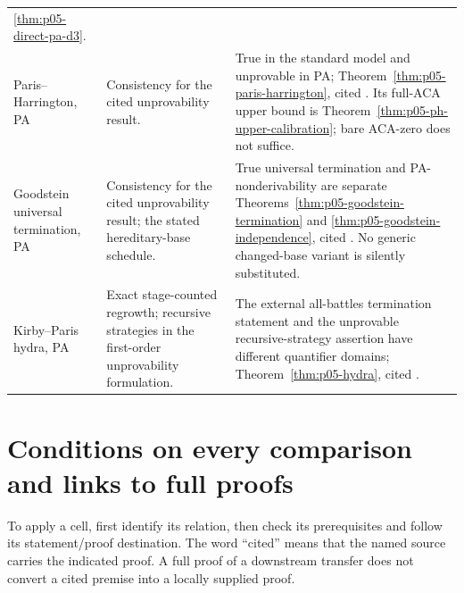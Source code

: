\begin{longtable}{@{}p{}p{}p{}@{}}
\ref{thm:p05-direct-pa-d3}. \\
\addlinespace
Paris--Harrington, PA & Consistency for the cited unprovability result. &
True in the standard model and unprovable in PA;
Theorem~\ref{thm:p05-paris-harrington}, cited
\cite{ParisHarrington1977}. Its full-ACA upper bound is
Theorem~\ref{thm:p05-ph-upper-calibration}; bare ACA-zero does not suffice. \\
\addlinespace
Goodstein universal termination, PA & Consistency for the cited
unprovability result; the stated hereditary-base schedule. &
True universal termination and PA-nonderivability are separate
Theorems~\ref{thm:p05-goodstein-termination} and
\ref{thm:p05-goodstein-independence}, cited
\cite{Goodstein1944,KirbyParis1982}. No generic changed-base variant is
silently substituted. \\
\addlinespace
Kirby--Paris hydra, PA & Exact stage-counted regrowth; recursive strategies
in the first-order unprovability formulation. &
The external all-battles termination statement and the unprovable
recursive-strategy assertion have different quantifier domains;
Theorem~\ref{thm:p05-hydra}, cited \cite{KirbyParis1982}. \\
\bottomrule
\end{longtable}
\endgroup

\section{Conditions on every comparison and links to full proofs}
\label{sec:p14-strength-conditions}


To apply a cell, first identify its relation, then check its prerequisites
and follow its statement/proof destination. The word ``cited'' means that
the named source carries the indicated proof. A full proof of a downstream
transfer does not convert a cited premise into a locally supplied proof.

